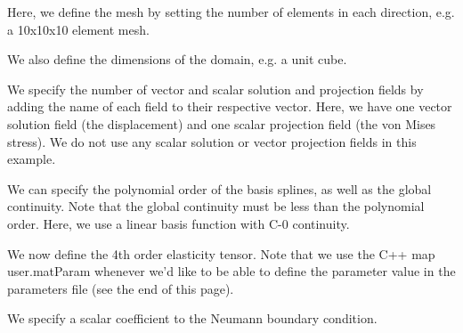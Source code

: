 \begin{DoxyCodeInclude}

\end{DoxyCodeInclude}


Here, we define the mesh by setting the number of elements in each direction, e.\-g. a 10x10x10 element mesh.


\begin{DoxyCodeInclude}

\end{DoxyCodeInclude}


We also define the dimensions of the domain, e.\-g. a unit cube.


\begin{DoxyCodeInclude}

\end{DoxyCodeInclude}


We specify the number of vector and scalar solution and projection fields by adding the name of each field to their respective vector. Here, we have one vector solution field (the displacement) and one scalar projection field (the von Mises stress). We do not use any scalar solution or vector projection fields in this example.


\begin{DoxyCodeInclude}

\end{DoxyCodeInclude}


We can specify the polynomial order of the basis splines, as well as the global continuity. Note that the global continuity must be less than the polynomial order. Here, we use a linear basis function with C-\/0 continuity.


\begin{DoxyCodeInclude}

\end{DoxyCodeInclude}


We now define the 4th order elasticity tensor. Note that we use the C++ map {\ttfamily user.\-mat\-Param} whenever we'd like to be able to define the parameter value in the parameters file (see the end of this page).


\begin{DoxyCodeInclude}

\end{DoxyCodeInclude}


We specify a scalar coefficient to the Neumann boundary condition.


\begin{DoxyCodeInclude}

\end{DoxyCodeInclude}


